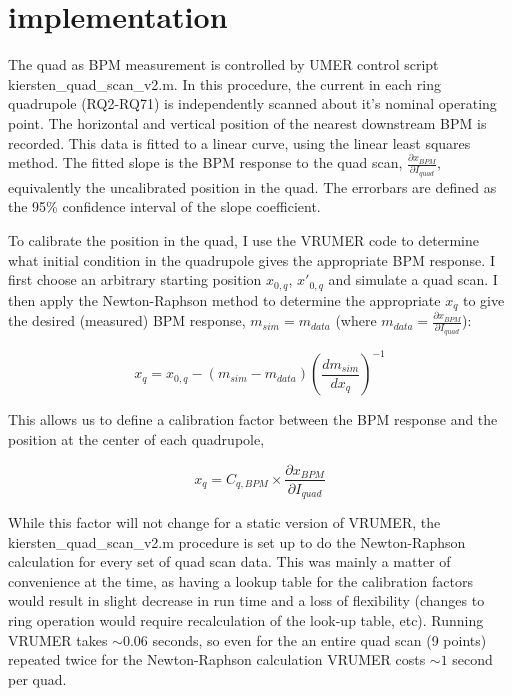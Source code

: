 \section{implementation}


The quad as BPM measurement is controlled by UMER control script \newline kiersten\_quad\_scan\_v2.m. 
In this procedure, the current in each ring quadrupole (RQ2-RQ71) is independently scanned about it's nominal 
operating point. The horizontal and vertical position of the nearest downstream BPM is recorded. This data is 
fitted to a linear curve, using the linear least squares method. The fitted slope is the BPM response to the 
quad scan, $\frac{\partial x_{BPM}}{\partial I_{quad}}$, equivalently the uncalibrated position in the quad. 
The errorbars are defined as the 95\% confidence interval of the slope coefficient. 

To calibrate the position in the quad, I use the VRUMER code to determine what initial condition in the quadrupole gives the appropriate BPM response.
I first choose an arbitrary starting position $x_{0,q}$, $x'_{0,q}$ and simulate a quad scan.
I then apply the Newton-Raphson method to determine the appropriate $x_q$ to give the desired (measured) BPM response, $m_{sim} = m_{data}$ (where $m_{data} = \frac{\partial x_{BPM}}{\partial I_{quad}}$): 


\begin{equation*}
 x_q = x_{0,q} - \left( m_{sim} - m_{data} \right) \left(\frac{dm_{sim}}{dx_q}\right)^{-1}
\end{equation*}

This allows us to define a calibration factor between the BPM response and the position at the center of each quadrupole, 

\begin{equation*}
x_q = C_{q,BPM} \times \frac{\partial x_{BPM}}{\partial I_{quad}}
\end{equation*}


While this factor will not change for a static version of VRUMER, the \newline  kiersten\_quad\_scan\_v2.m procedure is 
set up to do the Newton-Raphson calculation for every set of quad scan data. This was mainly a matter of convenience at 
the time, as having a lookup table for the calibration factors would result in slight decrease in run time and a loss of 
flexibility (changes to ring operation would require recalculation of the look-up table, etc). Running VRUMER takes $\sim 0.06$ 
seconds, so even for the an entire quad scan (9 points) repeated twice for the Newton-Raphson calculation VRUMER 
costs $\sim 1$ second per quad. 



